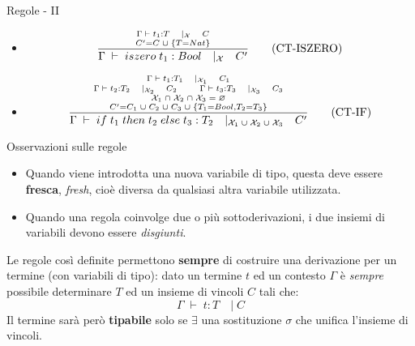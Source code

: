 \documentclass{beamer}
\newcommand*{\bfrac}[2]{\genfrac{}{}{0pt}{1}{#1}{#2}}
\begin{document}
\begin{tframe}{Regole - II}

\begin{itemize}

\item<1->[]
  \begin{equation}
    \frac{\bfrac{\Gamma \; \vdash \; t_1 : T \quad |_{\mathcal{X}} \quad C}{C' = C \; \cup  \;\{ T = Nat \}}}{\Gamma \; \vdash \; iszero \; t_1 : Bool \quad |_\mathcal{X} \quad C'}\tag{CT-ISZERO}
  \end{equation}
  \vspace{0.05cm}
\item<2->[]
  \begin{equation}
    \frac{\bfrac{\bfrac{\Gamma \; \vdash \; t_1 : T_1 \quad |_{\mathcal{X}_1} \quad C_1}{\Gamma \; \vdash \; t_2 : T_2 \quad |_{\mathcal{X}_2} \quad C_2 \qquad  \Gamma \; \vdash \; t_3 : T_3 \quad |_{\mathcal{X}_3} \quad C_3} }{\bfrac{\mathcal{X}_1 \; \cap \; \mathcal{X}_2 \; \cap \; \mathcal{X}_3 \; = \; \varnothing}{C' = C_1 \; \cup \; C_2 \; \cup \; C_3 \; \cup \; \{T_1 = Bool, T_2 = T_3\}  \vspace{0.1cm}}}}{\Gamma \; \vdash \; if \; t_1 \; then \; t_2 \; else \; t_3 : T_2 \quad |_{\mathcal{X}_1 \; \cup \; \mathcal{X}_2 \; \cup \; \mathcal{X}_3 } \quad C'}\tag{CT-IF}
  \end{equation}
\end{itemize}
\end{tframe}


\begin{tframe}{Osservazioni sulle regole}
\begin{itemize}
\item Quando viene introdotta una nuova variabile di tipo, questa deve essere \textbf{fresca}, \emph{fresh}, cioè diversa da qualsiasi altra variabile utilizzata.
\vspace{0.3cm}
\item Quando una regola coinvolge due o più sottoderivazioni, i due insiemi di variabili devono essere \emph{disgiunti}.
\end{itemize}
\vspace{0.3cm}
Le regole così definite permettono \textbf{sempre} di costruire una derivazione per un termine (con variabili di tipo): dato un termine $t$ ed un contesto $\Gamma$ è \emph{sempre} possibile determinare $T$ ed un insieme di vincoli $C$ tali che:
$$\Gamma \; \vdash \; t : T \quad | \; C$$
Il termine sarà però \textbf{tipabile} solo se $\exists$ una sostituzione $\sigma$ che unifica l'insieme di vincoli.
\end{tframe}
\end{document}
